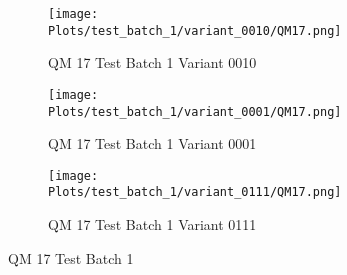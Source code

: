 \documentclass{DissertateFigs}
\begin{document}
\begin{figure}[t!]
\medskip

    \begin{subfigure}{0.43\textwidth}
    \texttt{[image: Plots/test\_batch\_1/variant\_0010/QM17.png]}
    \caption{QM 17 Test Batch 1 Variant 0010}
    \end{subfigure}
    \begin{subfigure}{0.43\textwidth}
    \texttt{[image: Plots/test\_batch\_1/variant\_0001/QM17.png]}
    \caption{QM 17 Test Batch 1 Variant 0001}
    \end{subfigure}

\medskip

    \begin{subfigure}{0.43\textwidth}
    \texttt{[image: Plots/test\_batch\_1/variant\_0111/QM17.png]}
    \caption{QM 17 Test Batch 1 Variant 0111}
    \end{subfigure}
\caption{QM 17 Test Batch 1}
    \end{figure}
\clearpage
\end{document}
